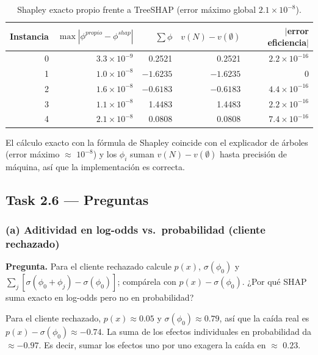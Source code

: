 \documentclass[11pt]{article}
\renewcommand{\_}{\textunderscore\allowbreak{}}
\begin{document}
\begin{table}[H]
\centering
\small
\begin{tabular}{rrrrr}
\toprule
Instancia & $\max|\phi^{propio}-\phi^{shap}|$ & $\sum\phi$ & $v(N)-v(\emptyset)$ & $|$error eficiencia$|$ \\
\midrule
0 & $3.3\times10^{-9}$ & 0.2521 & 0.2521 & $2.2\times10^{-16}$ \\
1 & $1.0\times10^{-8}$ & $-1.6235$ & $-1.6235$ & $0$ \\
2 & $1.6\times10^{-8}$ & $-0.6183$ & $-0.6183$ & $4.4\times10^{-16}$ \\
3 & $1.1\times10^{-8}$ & 1.4483 & 1.4483 & $2.2\times10^{-16}$ \\
4 & $2.1\times10^{-8}$ & 0.0808 & 0.0808 & $7.4\times10^{-16}$ \\
\bottomrule
\end{tabular}
\caption{Shapley exacto propio frente a TreeSHAP (error máximo global $2.1\times10^{-8}$).}
\end{table}

El cálculo exacto con la fórmula de Shapley coincide con el explicador de árboles (error máximo \(\approx\) \(10^{-8}\)) y los \(\phi_i\) suman \(v(N)-v(\emptyset)\) hasta precisión de máquina, así que la implementación es correcta.


\subsection*{Task 2.6 --- Preguntas}
\subsubsection*{(a) Aditividad en log-odds vs.\ probabilidad (cliente rechazado)}
\begin{tcolorbox}[colback=yellow!12, colframe=orange!70!black, boxrule=0.5pt, left=4pt, right=4pt]
\textbf{Pregunta.} Para el cliente rechazado calcule \(p(x)\), \(\sigma(\phi_0)\) y \(\sum_j[\sigma(\phi_0+\phi_j)-\sigma(\phi_0)]\); compárela con \(p(x)-\sigma(\phi_0)\). ¿Por qué SHAP suma exacto en log-odds pero no en probabilidad?
\end{tcolorbox}

Para el cliente rechazado, \(p(x) \approx 0.05\) y \(\sigma(\phi_0) \approx 0.79\), así que la caída real es \(p(x) - \sigma(\phi_0) \approx -0.74\). La suma de los efectos individuales en probabilidad da \(\approx -0.97\). Es decir, sumar los efectos uno por uno exagera la caída en \(\approx\) \(0.23\).
\end{document}
